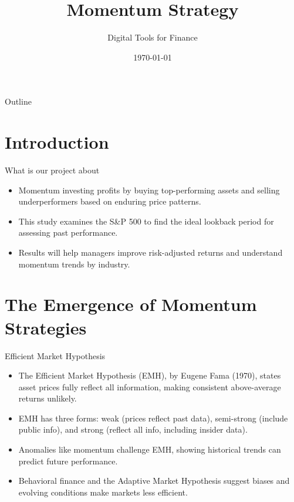 \documentclass{beamer}
\title{Momentum Strategy}
\author{Digital Tools for Finance}
\date{\today}
\begin{document}
\begin{frame}
    \titlepage
\end{frame}

\begin{frame}{Outline}
    \tableofcontents
\end{frame}

\section{Introduction}
\begin{frame}{What is our project about}
    
    \begin{itemize}
        \item Momentum investing profits by buying top-performing assets and selling underperformers based on enduring price patterns. 
        \item This study examines the S&P 500 to find the ideal lookback period for assessing past performance.
        \item Results will help managers improve risk-adjusted returns and understand momentum trends by industry.
    \end{itemize}
\end{frame}

\section{The Emergence of Momentum Strategies}


\begin{frame}{Efficient Market Hypothesis}

    \begin{itemize}
        \item The Efficient Market Hypothesis (EMH), by Eugene Fama (1970), states asset prices fully reflect all information, making consistent above-average returns unlikely.
        \item EMH has three forms: weak (prices reflect past data), semi-strong (include public info), and strong (reflect all info, including insider data).
        \item Anomalies like momentum challenge EMH, showing historical trends can predict future performance.
        \item Behavioral finance and the Adaptive Market Hypothesis suggest biases and evolving conditions make markets less efficient.
    \end{itemize}
\end{frame}
\end{document}
